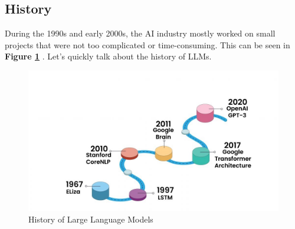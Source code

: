 \subsection{History}
During the 1990s and early 2000s, the AI industry mostly worked on small projects that were not too complicated or time-consuming. This can be seen in \textbf{Figure \ref{fig:llm_historic}} \cite{w10}. Let's quickly talk about the history of LLMs.
\begin{figure}[H]
    \label{fig:llm_historic}
    \centering
    \includegraphics[width=1 \linewidth]{assets/llm_historic.jpeg}
    \caption{History of Large Language Models}
\end{figure}

